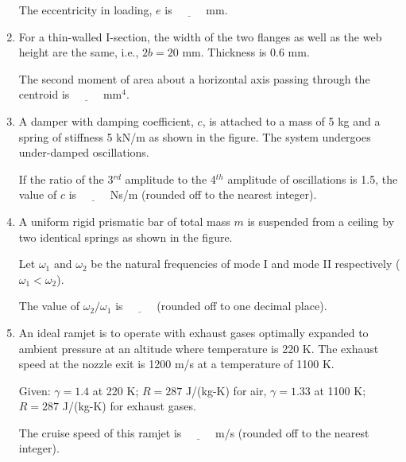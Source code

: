 \documentclass[journal,9pt,onecolumn]{IEEEtran}
\begin{document}
\begin{enumerate}
The eccentricity in loading, $e$ is $\underline{\hspace{1cm}}$ mm. 
\begin{center}
    
\end{center}
\item For a thin-walled I-section, the width of the two flanges as well as the web height are the same, i.e., $2b = 20$ mm. Thickness is 0.6 mm.

The second moment of area about a horizontal axis passing through the centroid is $\underline{\hspace{1cm}}$ mm$^4$.  
\begin{center}
    
\end{center}
\item A damper with damping coefficient, $c$, is attached to a mass of 5 kg and a spring of stiffness 5 kN/m as shown in the figure. The system undergoes under-damped oscillations.

If the ratio of the 3$^{rd}$ amplitude to the 4$^{th}$ amplitude of oscillations is 1.5, the value of $c$ is $\underline{\hspace{1cm}}$ Ns/m (rounded off to the nearest integer).  
\begin{center}
    
\end{center}
\item A uniform rigid prismatic bar of total mass $m$ is suspended from a ceiling by two identical springs as shown in the figure.

Let $\omega_1$ and $\omega_2$ be the natural frequencies of mode I and mode II respectively ($\omega_1 < \omega_2$).  

The value of $\omega_2/\omega_1$ is $\underline{\hspace{1cm}}$ (rounded off to one decimal place).
\begin{center}
    
\end{center}
\item An ideal ramjet is to operate with exhaust gases optimally expanded to ambient pressure at an altitude where temperature is 220 K. The exhaust speed at the nozzle exit is 1200 m/s at a temperature of 1100 K.

Given: $\gamma = 1.4$ at 220 K; $R = 287$ J/(kg-K) for air, $\gamma = 1.33$ at 1100 K; $R = 287$ J/(kg-K) for exhaust gases.

The cruise speed of this ramjet is $\underline{\hspace{1cm}}$ m/s (rounded off to the nearest integer).  


\end{enumerate}
\end{document}
